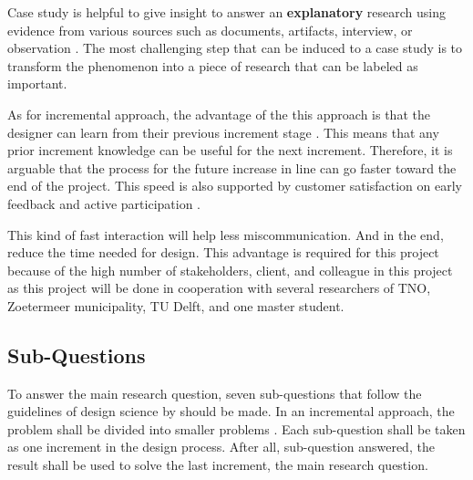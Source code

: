 Case study is helpful to give insight to answer an \textbf{explanatory} research using evidence from various sources such as documents, artifacts, interview, or observation \citep{Rowley2002UsingResearch}. The most challenging step that can be induced to a case study is to transform the phenomenon into a piece of research that can be labeled as important.  

As for incremental approach, the advantage of the this approach is that the designer can learn from their previous increment stage \citep{Larman2004AgileLivros}.  This means that any prior increment knowledge can be useful for the next increment. Therefore, it is arguable that the process for the future increase in line can go faster toward the end of the project. This speed is also supported by customer satisfaction on early feedback and active participation \citep{Petersen2009TheDevelopment}. 

This kind of fast interaction will help less miscommunication. And in the end, reduce the time needed for design. This advantage is required for this project because of the high number of stakeholders, client, and colleague in this project as this project will be done in cooperation with several researchers of TNO, Zoetermeer municipality, TU Delft, and one master student. 


\subsection{Sub-Questions}

To answer the main research question, seven sub-questions that follow the guidelines of design science by \citep{Hevner2004DesignResearch} should be made. In an incremental approach, the problem shall be divided into smaller problems \citep{Cockburn1998UsingDevelopment}. Each sub-question shall be taken as one increment in the design process. After all, sub-question answered, the result shall be used to solve the last increment, the main research question. 

